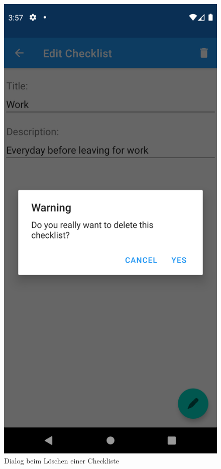 \begin{figure}[h]
	\hfill
	\begin{minipage}{0.45\linewidth}
		\centering
		\includegraphics[width=.9\linewidth]{Bilder/DeleteChecklist.png}
		\caption{Dialog beim Löschen einer Checkliste}
		\label{fig:deleteDialog}
	\end{minipage}
\end{figure}

